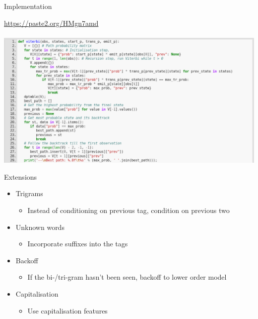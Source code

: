 \documentclass{beamer}
\begin{document}
\begin{frame}{Implementation}
\begin{center}
\url{https://paste2.org/HMgn7amd}
~\\
~\\
\includegraphics[width=\textwidth]{images/viterbi-wp.png}
\end{center}

\end{frame}

\begin{frame}{Extensions}

\begin{itemize}
  \item Trigrams
  \begin{itemize}
     \item Instead of conditioning on previous tag, condition on previous two
  \end{itemize}
  \item Unknown words
  \begin{itemize}
     \item Incorporate suffixes into the tags
  \end{itemize} 
  \item Backoff 
  \begin{itemize}
    \item If the bi-/tri-gram hasn't been seen, backoff to lower order model
  \end{itemize}
  \item Capitalisation
  \begin{itemize}
    \item Use capitalisation features 
  \end{itemize}
\end{itemize}


\end{frame}
\end{document}
